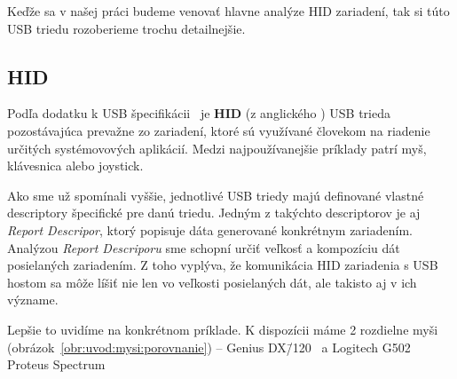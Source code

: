 Keďže sa v našej práci budeme venovať hlavne analýze HID zariadení, tak si túto USB triedu rozoberieme trochu detailnejšie.

\subsection*{HID}
\label{uvod:sec:HID}

Podľa dodatku k USB špecifikácii~\cite{usbhid} je \textbf{HID} (z anglického ) USB trieda pozostávajúca prevažne zo zariadení, ktoré sú využívané človekom na riadenie určitých systémovových aplikácií. Medzi najpoužívanejšie príklady patrí myš, klávesnica alebo joystick.

Ako sme už spomínali vyššie, jednotlivé USB triedy majú definované vlastné descriptory špecifické pre danú triedu. Jedným z takýchto descriptorov je aj \textit{Report Descripor}, ktorý popisuje dáta generované konkrétnym zariadením. Analýzou \textit{Report Descriporu} sme schopní určiť veľkosť a kompozíciu dát posielaných zariadením. Z toho vyplýva, že komunikácia HID zariadenia s USB hostom sa môže líšiť nie len vo veľkosti posielaných dát, ale takisto aj v ich význame.

Lepšie to uvidíme na konkrétnom príklade. K dispozícii máme 2 rozdielne myši (obrázok~\ref{obr:uvod:mysi:porovnanie}) -- Genius DX\=/120~\cite{genius_mouse} a Logitech G502 Proteus Spectrum~\cite{logitech_mouse}

